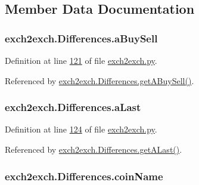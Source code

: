 \subsection{Member Data Documentation}
\subsubsection[{\texorpdfstring{a\+Buy\+Sell}{aBuySell}}]{\setlength{\rightskip}{0pt plus 5cm}exch2exch.\+Differences.\+a\+Buy\+Sell}\hypertarget{classexch2exch_1_1_differences_aac9b76364eb6e0ee83417c0128aaa001}{}\label{classexch2exch_1_1_differences_aac9b76364eb6e0ee83417c0128aaa001}


Definition at line \hyperlink{exch2exch_8py_source_l00121}{121} of file \hyperlink{exch2exch_8py_source}{exch2exch.\+py}.



Referenced by \hyperlink{exch2exch_8py_source_l00139}{exch2exch.\+Differences.\+get\+A\+Buy\+Sell()}.

\subsubsection[{\texorpdfstring{a\+Last}{aLast}}]{\setlength{\rightskip}{0pt plus 5cm}exch2exch.\+Differences.\+a\+Last}\hypertarget{classexch2exch_1_1_differences_abd4dd96bd69025147d0bdb33d9c69345}{}\label{classexch2exch_1_1_differences_abd4dd96bd69025147d0bdb33d9c69345}


Definition at line \hyperlink{exch2exch_8py_source_l00124}{124} of file \hyperlink{exch2exch_8py_source}{exch2exch.\+py}.



Referenced by \hyperlink{exch2exch_8py_source_l00145}{exch2exch.\+Differences.\+get\+A\+Last()}.

\subsubsection[{\texorpdfstring{coin\+Name}{coinName}}]{\setlength{\rightskip}{0pt plus 5cm}exch2exch.\+Differences.\+coin\+Name}\hypertarget{classexch2exch_1_1_differences_a0fb17548553b86b0ae62c2ef1a30981b}{}\label{classexch2exch_1_1_differences_a0fb17548553b86b0ae62c2ef1a30981b}


